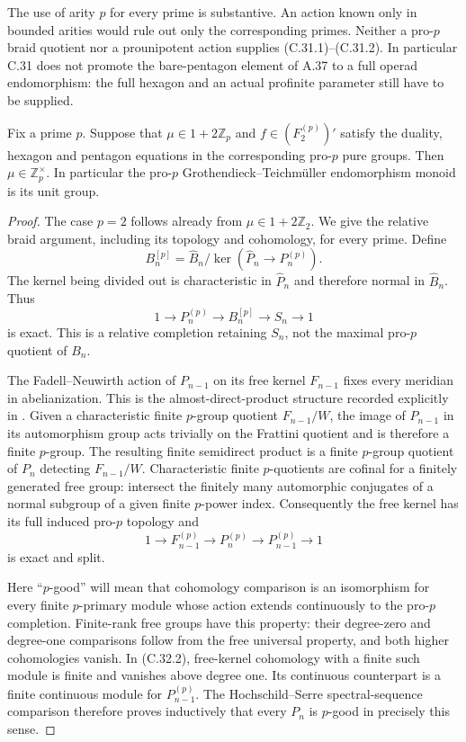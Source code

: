 The use of arity $p$ for every prime is substantive. An action known
only in bounded arities would rule out only the corresponding
primes. Neither a pro-$p$ braid quotient nor a prounipotent action
supplies (C.31.1)--(C.31.2). In particular C.31 does not promote the
bare-pentagon element of A.37 to a full operad endomorphism: the full
hexagon and an actual profinite parameter still have to be supplied.

Fix a prime $p$. Suppose that
$\mu\in1+2\mathbb Z_p$ and $f\in(F_2^{(p)})'$ satisfy the duality,
hexagon and pentagon equations in the corresponding pro-$p$ pure
groups. Then $\mu\in\mathbb Z_p^\times$. In particular the pro-$p$
Grothendieck--Teichm\"uller endomorphism monoid is its unit group.

\begin{proof}
The case $p=2$ follows already from $\mu\in1+2\mathbb Z_2$.
We give the relative braid argument, including its topology and
cohomology, for every prime. Define
\[
 B_n^{[p]}=\widehat B_n/
       \ker(\widehat P_n\longrightarrow P_n^{(p)}).
\]
The kernel being divided out is characteristic in $\widehat P_n$
and therefore normal in $\widehat B_n$. Thus
\[
 1\longrightarrow P_n^{(p)}\longrightarrow B_n^{[p]}
       \longrightarrow S_n\longrightarrow1                    \tag{C.32.1}
\]
is exact. This is a relative completion retaining $S_n$, not the
maximal pro-$p$ quotient of $B_n$.

The Fadell--Neuwirth action of $P_{n-1}$ on its free kernel
$F_{n-1}$ fixes every meridian in abelianization. This is the
almost-direct-product structure recorded explicitly in
\cite[Example 1.1]{CECohen2010}. Given a characteristic finite
$p$-group quotient $F_{n-1}/W$, the image of $P_{n-1}$ in its
automorphism group acts trivially on the Frattini quotient and
is therefore a finite $p$-group. The resulting finite semidirect
product is a finite $p$-group quotient of $P_n$ detecting
$F_{n-1}/W$. Characteristic finite $p$-quotients are cofinal for a
finitely generated free group: intersect the finitely many
automorphic conjugates of a normal subgroup of a given finite
$p$-power index. Consequently the free kernel has its full
induced pro-$p$ topology and
\[
 1\longrightarrow F_{n-1}^{(p)}\longrightarrow P_n^{(p)}
       \longrightarrow P_{n-1}^{(p)}\longrightarrow1             \tag{C.32.2}
\]
is exact and split.

Here ``$p$-good'' will mean that cohomology comparison is an
isomorphism for every finite $p$-primary module whose action extends
continuously to the pro-$p$ completion. Finite-rank free groups have
this property: their degree-zero and degree-one comparisons follow
from the free universal property, and both higher cohomologies
vanish. In (C.32.2), free-kernel cohomology with a finite such module
is finite and vanishes above degree one. Its continuous counterpart
is a finite continuous module for $P_{n-1}^{(p)}$. The
Hochschild--Serre spectral-sequence comparison therefore proves
inductively that every $P_n$ is $p$-good in precisely this sense.


\end{proof}
